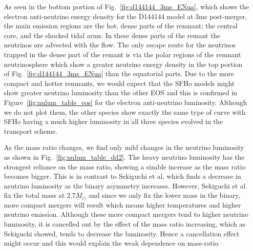 
As seen in the bottom portion of Fig.~\ref{fig:d144144_3ms_ENua}, which shows the electron anti-neutrino energy density for the D144144 model at 3ms post-merger, the main emission regions are the hot, dense parts of the remnant; the central core, and the shocked tidal arms. In these dense parts of the remant the neutrinos are advected with the flow. The only escape route for the neutrinos trapped in the dense part of the remant is via the polar regions of the remnant neutrinosphere which show a greater neutrino energy density in the top portion of Fig.~\ref{fig:d144144_3ms_ENua} than the equatorial parts. Due to the more compact and hotter remnants,  we would expect that the SFHo models might show greater neutrino luminosity than the other EOS and this is confirmed in Figure~\ref{fig:nulum_table_eos} for the electron anti-neutrino luminosity. Although we do not plot them, the other species show exactly the same type of curve with SFHo having a much higher luminosity in all three species evolved in the transport scheme.

As the mass ratio changes, we find only mild changes in the neutrino luminosity as shown in Fig.~\ref{fig:nulum_table_dd2}. The heavy neutrino luminosity has the strongest reliance on the mass ratio, showing a sizable increase as the mass ratio becomes bigger. This is in contrast to Sekiguchi et al. \cite{sekiguchi:2016} which finds a decrease in neutrino luminosity as the binary asymmetry increases. However, Sekiguchi et al. fix the total mass at $2.7M_\odot$ and since we only fix the lower mass in the binary, more compact mergers will result which means higher temperatures and higher neutrino emission. Although these more compact mergers tend to higher neutrino luminosity, it is cancelled out by the effect of the mass ratio increasing, which as Sekiguchi showed, tends to decrease the luminosity. Hence a cancellation effect might occur and this would explain the weak dependence on mass-ratio.
%

